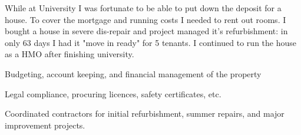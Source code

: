 {}
While at University I was fortunate to be able to put down the deposit for a house. To cover the mortgage and running costs I needed to rent out rooms. I bought a house in severe dis-repair and project managed it's refurbishment: in only 63 days I had it "move in ready" for 5 tenants. I continued to run the house as a HMO after finishing university.
\vspace{0.25em}
\begin{tightemize}
  \item Budgeting, account keeping, and financial management of the property
  \item Legal compliance, procuring licences, safety certificates, etc.
  \item Coordinated contractors for initial refurbishment, summer repairs, and major improvement projects.
\end{tightemize}
\sectionsep
